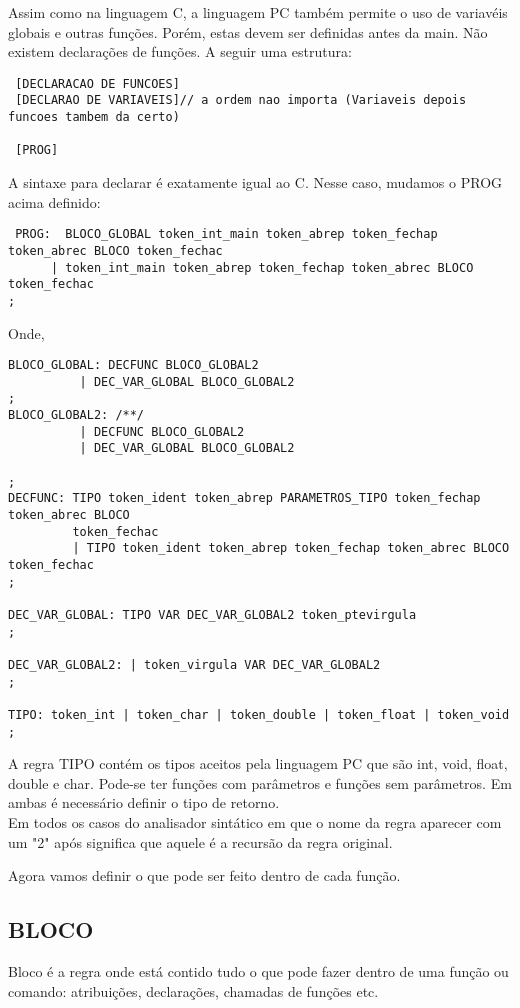 \documentclass[a4paper,10pt]{article}
\begin{document}
Assim como na linguagem C, a linguagem PC também permite o uso de variavéis globais e outras funções. Porém, estas devem ser definidas
antes da main. Não existem declarações de funções. A seguir uma estrutura:

\begin{verbatim}
 [DECLARACAO DE FUNCOES]
 [DECLARAO DE VARIAVEIS]// a ordem nao importa (Variaveis depois funcoes tambem da certo)
 
 [PROG]
\end{verbatim}

A sintaxe para declarar é exatamente igual ao C. Nesse caso, mudamos o PROG acima definido:

\begin{verbatim}
 PROG:	BLOCO_GLOBAL token_int_main token_abrep token_fechap token_abrec BLOCO token_fechac
      | token_int_main token_abrep token_fechap token_abrec BLOCO token_fechac
;
\end{verbatim}
Onde,
\begin{verbatim}
BLOCO_GLOBAL: DECFUNC BLOCO_GLOBAL2
	      | DEC_VAR_GLOBAL BLOCO_GLOBAL2
;
BLOCO_GLOBAL2: /**/
	      | DECFUNC BLOCO_GLOBAL2
	      | DEC_VAR_GLOBAL BLOCO_GLOBAL2
		
;
DECFUNC: TIPO token_ident token_abrep PARAMETROS_TIPO token_fechap token_abrec BLOCO 
         token_fechac
         | TIPO token_ident token_abrep token_fechap token_abrec BLOCO token_fechac
;

DEC_VAR_GLOBAL: TIPO VAR DEC_VAR_GLOBAL2 token_ptevirgula
;

DEC_VAR_GLOBAL2: | token_virgula VAR DEC_VAR_GLOBAL2
;

TIPO: token_int | token_char | token_double | token_float | token_void
;
\end{verbatim}

A regra TIPO contém os tipos aceitos pela linguagem PC que são int, void, float, double e char. Pode-se ter funções com parâmetros e funções sem parâmetros.
Em ambas é necessário definir o tipo de retorno.\\

Em todos os casos do analisador sintático em que o nome da regra aparecer com um "2" após significa que aquele é a recursão da regra original.

Agora vamos definir o que pode ser feito dentro de cada função.
\subsection{BLOCO}
Bloco é a regra onde está contido tudo o que pode fazer dentro de uma função ou comando: atribuições, declarações, chamadas de funções etc.
\end{document}
